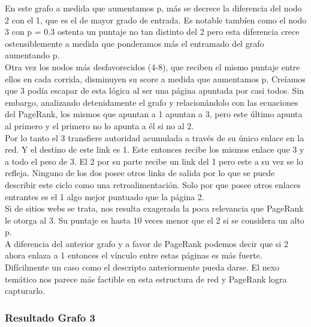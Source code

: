 En este grafo a medida que aumentamos p, más se decrece la diferencia del nodo 2 con el 1, que es el de mayor grado de entrada. Es notable tambíen como el nodo 3 con p = 0.3 ostenta un puntaje no tan distinto del 2 pero esta diferencia crece ostensiblemente a medida que ponderamos más el entramado del grafo aumentando p. \\

Otra vez los nodos más desfavorecidos (4-8), que reciben el mismo puntaje entre ellos en cada corrida, disminuyen su score a medida que aumentamos p. Creíamos que 3 podía escapar de esta lógica al ser una página apuntada por casi todos. Sin embargo, analizando detenidamente el grafo y relacionándolo con las ecuaciones del PageRank, los mismos que apuntan a 1 apuntan a 3, pero este último apunta al primero y el primero no lo apunta a él si no al 2. \\

Por lo tanto el 3 transfiere autoridad acumulada a través de su único enlace en la red. Y el destino de este link es 1. Este entonces recibe los mismos enlace que 3 y a todo el peso de 3. El 2 por su parte recibe un link del 1 pero este a su vez se lo refleja. Ninguno de los dos posee otros links de salida por lo que se puede describir este ciclo como una retroalimentación. Solo por que posee otros enlaces entrantes es el 1 algo mejor puntuado que la página 2. \\

Si de sitios webs se trata, nos resulta exagerada la poca relevancia que PageRank le otorga al 3. Su puntaje es hasta 10 veces menor que el 2 si se considera un alto p.\\
A diferencia del anterior grafo y a favor de PageRank podemos decir que si 2 ahora enlaza a 1 entonces el vínculo entre estas páginas es más fuerte. Difícilmente un caso como el descripto anteriormente pueda darse. El nexo temático nos parece más factible en esta estructura de red y PageRank logra capturarlo. \\

\subsubsection{Resultado Grafo 3}   
            

